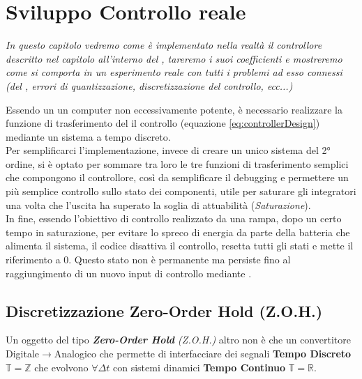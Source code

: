 \chapter{Sviluppo Controllo reale}\label{cap:controlDevelop}

\begin{minipage}{12cm}\textit{
		In questo capitolo vedremo come è implementato nella realtà il controllore descritto nel capitolo  all'interno del \microControllore, tareremo i suoi coefficienti e mostreremo come si comporta in un esperimento reale con tutti i problemi ad esso connessi (\nonLinearita del \cite*{IBT-2}, errori di quantizzazione, discretizzazione del controllo, ecc...)
	}
\end{minipage}

\vspace*{1cm}
\noindent
Essendo un \microControllore un computer non eccessivamente potente, è necessario realizzare la funzione di trasferimento del il controllo (equazione \ref{eq:controllerDesign}) mediante un sistema a tempo discreto.\\
Per semplificarci l'implementazione, invece di creare un unico sistema del 2° ordine, si è optato per sommare tra loro le tre funzioni di trasferimento semplici che compongono il controllore, così da semplificare il debugging e permettere un più semplice controllo sullo stato dei componenti, utile per saturare gli integratori una volta che l'uscita ha superato la soglia di attuabilità (\textit{Saturazione}).\\
In fine, essendo l'obiettivo di controllo realizzato da una rampa, dopo un certo tempo in saturazione, per evitare lo spreco di energia da parte della batteria che alimenta il sistema, il codice disattiva il controllo, resetta tutti gli stati e mette il riferimento a 0. Questo stato non è permanente ma persiste fino al raggiungimento di un nuovo input di controllo mediante \cite*{EMP}.

\newpage
\section{Discretizzazione Zero-Order Hold (Z.O.H.)}
Un oggetto del tipo \textit{\textbf{Zero-Order Hold} (Z.O.H.)} altro non è che un convertitore Digitale$ \rightarrow $Analogico che permette di interfacciare dei segnali \textbf{Tempo Discreto} $\mathbb{T} =  \mathbb{Z} $ che evolvono $\forall \Delta t $ con sistemi dinamici \textbf{Tempo Continuo} $\mathbb{T} =  \mathbb{R} $.

